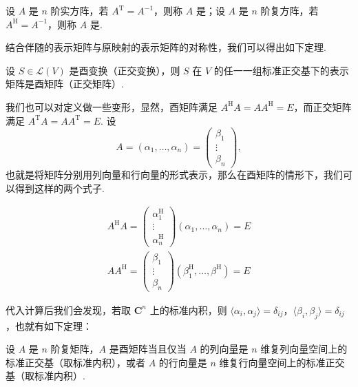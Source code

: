 \begin{definition}{}{}  
    设 $ A $ 是 $ n $ 阶实方阵，若 $ A^{\mathrm{T}} = A^{-1} $，则称 $ A $ 是；设 $ A $ 是 $ n $ 阶复方阵，若 $ A^\mathrm{H} = A^{-1} $，则称 $ A $ 是.
\end{definition}

结合伴随的表示矩阵与原映射的表示矩阵的对称性，我们可以得出如下定理.

\begin{theorem}{}{}
    设 $ S \in \mathcal{L}(V) $ 是酉变换（正交变换），则 $ S $ 在 $ V $ 的任一一组标准正交基下的表示矩阵是酉矩阵（正交矩阵）.
\end{theorem}

我们也可以对定义做一些变形，显然，酉矩阵满足 $ A^\mathrm{H}A = AA^\mathrm{H} = E $，而正交矩阵满足 $ A^{\mathrm{T}}A = AA^{\mathrm{T}} = E $. 设 \[
    A = (\alpha_1, \ldots, \alpha_n) = \begin{pmatrix}
        \beta_1 \\
        \vdots  \\
        \beta_n
    \end{pmatrix},
\]
也就是将矩阵分别用列向量和行向量的形式表示，那么在酉矩阵的情形下，我们可以得到这样的两个式子.

\begin{gather*}
    A^{\mathrm{H}}A = \begin{pmatrix}
        \alpha_1^{\mathrm{H}} \\
        \vdots                \\
        \alpha_n^{\mathrm{H}}
    \end{pmatrix} (\alpha_1, \ldots, \alpha_n) = E \\
    AA^{\mathrm{H}} = \begin{pmatrix}
        \beta_1 \\
        \vdots  \\
        \beta_n
    \end{pmatrix} (\beta_1^{\mathrm{H}}, \ldots, \beta^{\mathrm{H}}) = E
\end{gather*}

代入计算后我们会发现，若取 $ \mathbf{C}^n $ 上的标准内积，则 $ \langle \alpha_i, \alpha_j \rangle = \delta_{ij} $，$ \langle \beta_i, \beta_j \rangle = \delta_{ij} $，也就有如下定理：

\begin{theorem}{}{}
    设 $ A $ 是 $ n $ 阶复矩阵，$ A $ 是酉矩阵当且仅当 $ A $ 的列向量是 $ n $ 维复列向量空间上的标准正交基（取标准内积），或者 $ A $ 的行向量是 $ n $ 维复行向量空间上的标准正交基（取标准内积）.
\end{theorem}

